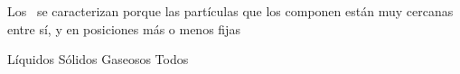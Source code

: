 
\question Los \fillin\ se caracterizan porque las partículas que
los componen están muy cercanas entre sí, y en posiciones más o menos fijas

  \begin{oneparchoices}
    \choice Líquidos
    \CorrectChoice Sólidos
    \choice Gaseosos
    \choice Todos
  \end{oneparchoices}
  \answerline[B]
